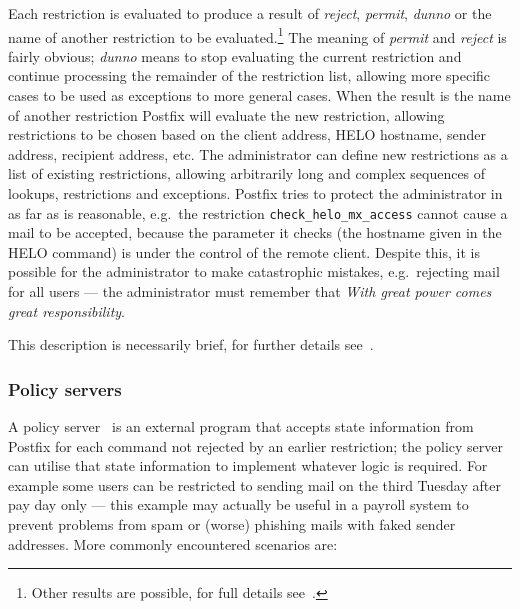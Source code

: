 Each restriction is evaluated to produce a result of \textit{reject},
\textit{permit}, \textit{dunno\/} or the name of another restriction to be
evaluated.\footnote{Other results are possible, for full details
see~\cite{smtpd_access_readme, smtpd_per_user_control, policy-servers}.}
The meaning of \textit{permit\/} and \textit{reject\/} is fairly obvious;
\textit{dunno\/} means to stop evaluating the current restriction and
continue processing the remainder of the restriction list, allowing more
specific cases to be used as exceptions to more general cases.  When the
result is the name of another restriction Postfix will evaluate the new
restriction, allowing restrictions to be chosen based on the client \IP{}
address, HELO hostname, sender address, recipient address, etc.  The
administrator can define new restrictions as a list of existing
restrictions, allowing arbitrarily long and complex sequences of lookups,
restrictions and exceptions.  Postfix tries to protect the administrator in
as far as is reasonable, e.g.\ the restriction
\texttt{check\_helo\_mx\_access} cannot cause a mail to be accepted,
because the parameter it checks (the hostname given in the HELO command) is
under the control of the remote client.  Despite this, it is possible for
the administrator to make catastrophic mistakes, e.g.\ rejecting mail for
all users --- the administrator must remember that \textit{With great
power comes great responsibility}.

This description is necessarily brief, for further details
see~\cite{smtpd_access_readme, smtpd_per_user_control, policy-servers}.


\subsubsection{Policy servers}

\label{policy servers}

A policy server~\cite{policy-servers} is an external program that accepts
state information from Postfix for each \SMTP{} command not rejected by an
earlier restriction; the policy server can utilise that state information
to implement whatever logic is required.  For example some users can be
restricted to sending mail on the third Tuesday after pay day only --- this
example may actually be useful in a payroll system to prevent problems from
spam or (worse) phishing mails with faked sender addresses.  More commonly
encountered scenarios are:

